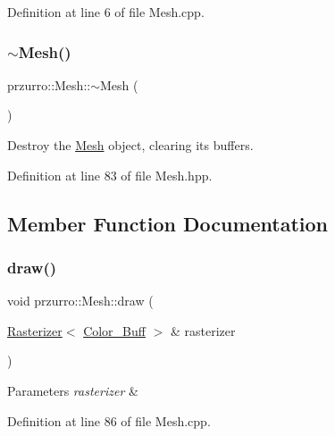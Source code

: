 Definition at line 6 of file Mesh.\+cpp.

\mbox{\label{classprzurro_1_1_mesh_ab6130f009818dbae0e61d6014e963b01}} 
\subsubsection{\texorpdfstring{$\sim$Mesh()}{~Mesh()}}
{\footnotesize\ttfamily przurro\+::\+Mesh\+::$\sim$\+Mesh (\begin{DoxyParamCaption}{ }\end{DoxyParamCaption})\hspace{0.3cm}{\ttfamily [inline]}}



Destroy the \mbox{\hyperlink{classprzurro_1_1_mesh}{Mesh}} object, clearing it\textquotesingle{}s buffers. 



Definition at line 83 of file Mesh.\+hpp.



\subsection{Member Function Documentation}
\mbox{\label{classprzurro_1_1_mesh_a15a924f0e1e05969dccea6f8903e2ad0}} 
\subsubsection{\texorpdfstring{draw()}{draw()}}
{\footnotesize\ttfamily void przurro\+::\+Mesh\+::draw (\begin{DoxyParamCaption}\item[{\mbox{\hyperlink{classprzurro_1_1_rasterizer}{Rasterizer}}$<$ \mbox{\hyperlink{classprzurro_1_1_color___buffer___rgba8888}{Color\+\_\+\+Buff}} $>$ \&}]{rasterizer }\end{DoxyParamCaption})}


\begin{DoxyParams}{Parameters}
{\em rasterizer} & \\
\hline
\end{DoxyParams}


Definition at line 86 of file Mesh.\+cpp.

